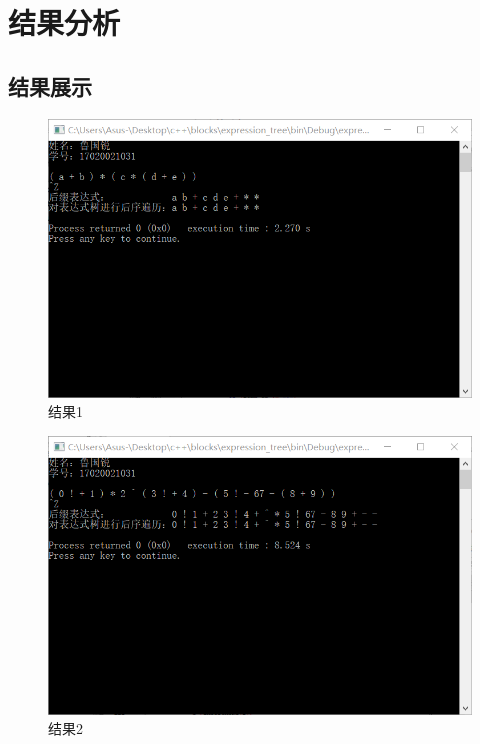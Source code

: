 \documentclass[UTF8]{ctexart}
\begin{document}
	\section{结果分析}
	\subsection{结果展示}

\begin{figure}[H]
	\centering 
	\includegraphics[scale=0.85]{res1.png} 
	\caption{结果1} 
	\label{res1}
\end{figure}

\begin{figure}[H]
	\centering 
	\includegraphics[scale=0.85]{res2.png} 
	\caption{结果2} 
	\label{res2}
\end{figure}
\end{document}
